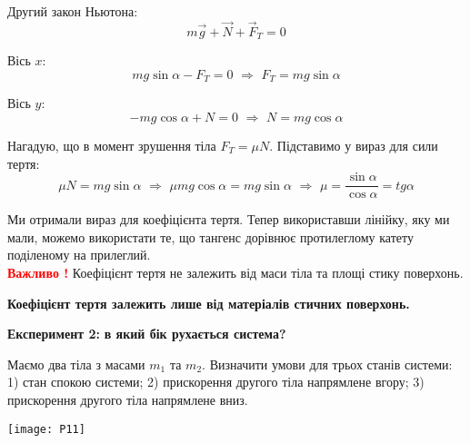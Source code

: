 \documentclass[a4paper,12pt]{article}
\begin{document}
Другий закон Ньютона: $$m\vec{g} + \vec{N} + \vec{F}_T = 0$$

Вісь $x$: $$mg\sin \alpha - F_T = 0\,\,\Rightarrow\,\,F_T = mg\sin \alpha$$

Вісь $y$: $$ -mg\cos \alpha + N = 0\,\,\Rightarrow\,\,N = mg\cos\alpha$$ 

Нагадую, що в момент зрушення тіла $F_T = \mu N$. Підставимо у вираз для сили тертя: $$\mu N = mg \sin \alpha\,\,\Rightarrow\,\,\mu mg \cos \alpha = mg \sin \alpha\,\,\Rightarrow\,\,\boxed{\mu = \dfrac{\sin \alpha}{\cos \alpha} = tg \alpha}$$ 

Ми отримали вираз для коефіцієнта тертя. Тепер використавши лінійку, яку ми мали, можемо використати те, що тангенс дорівнює протилеглому катету поділеному на прилеглий.\\

\textcolor{red}{\textbf{Важливо !}} Коефіцієнт тертя не залежить від маси тіла та площі стику поверхонь. \begin{center}\textcolor{EdErablue}{\textbf{Коефіцієнт тертя залежить лише від матеріалів стичних поверхонь. }} \end{center}\newpage
\begin{center}\textcolor{EdErablue}{\textbf{Експеримент 2:}} \textbf{в який бік рухається система? } \end{center}
Маємо два тіла з масами $m_1$ та $m_2$. Визначити умови для трьох станів системи: 1) стан спокою системи; 2) прискорення другого тіла напрямлене вгору; 3) прискорення другого тіла напрямлене вниз.
\begin{center}\texttt{[image: P11]} \end{center}
\end{document}
